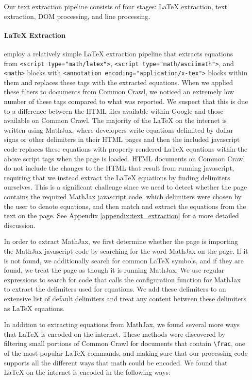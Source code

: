 Our text extraction pipeline consists of four stages: \LaTeX{} extraction, text extraction, DOM processing, and line processing.

\paragraph{\LaTeX{} Extraction} \citet{lewkowycz2022solving} employ a relatively simple \LaTeX{} extraction pipeline that extracts equations from \texttt{<script type="math/latex">}, \texttt{<script type="math/asciimath">}, and \texttt{<math>} blocks with \texttt{<annotation encoding="application/x-tex">} blocks within them and replaces these tags with the extracted equations. When we applied these filters to documents from Common Crawl, we noticed an extremely low number of these tags compared to what was reported. We suspect that this is due to a difference between the HTML files available within Google \citep{lewkowycz2022solving} and those available on Common Crawl. The majority of the \LaTeX{} on the internet is written using MathJax, where developers write equations delimited by dollar signs or other delimiters in their HTML pages and then the included javascript code replaces these equations with properly rendered \LaTeX{} equations within the above script tags when the page is loaded. HTML documents on Common Crawl do not include the changes to the HTML that result from running javascript, requiring that we instead extract the \LaTeX{} equations by finding delimiters ourselves. This is a significant challenge since we need to detect whether the page contains the required MathJax javascript code, which delimiters were chosen by the user to denote equations, and then match and extract the equations from the text on the page. See Appendix \ref{appendix:text_extraction} for a more detailed discussion. 

In order to extract MathJax, we first determine whether the page is importing the MathJax javascript code by searching for the word MathJax on the page. If it is not found, we additionally search for common \LaTeX{} symbols, and if they are found, we treat the page as though it is running MathJax. We use regular expressions to search for code that calls the configuration function for MathJax to extract the delimiters used for equations. We add these delimiters to an extensive list of default delimiters and treat any content between these delimiters as \LaTeX{} equations.

In addition to extracting equations from MathJax, we found several more ways that \LaTeX{} is encoded on the internet. These methods were discovered by filtering small portions of Common Crawl for documents that contain \texttt{\textbackslash frac}, one of the most popular \LaTeX{} commands, and making sure that our processing code supports all the different ways that math could be encoded. We found that \LaTeX{} on the internet is encoded in the following ways:

